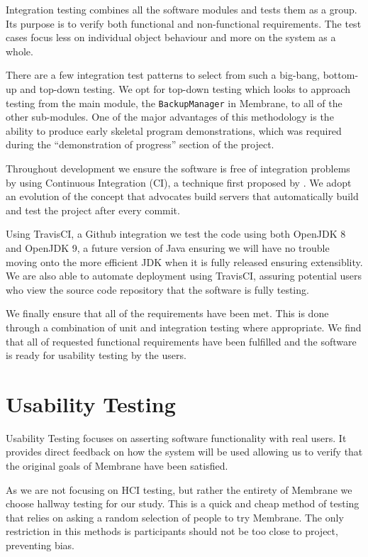 \documentclass[11pt, a4paper, twoside]{report}
\def\code#1{\texttt{#1}}
\begin{document}
Integration testing combines all the software modules and tests them as a group. Its purpose is to verify both functional and non-functional requirements. The test cases focus less on individual object behaviour and more on the system as a whole.

There are a few integration test patterns to select from such a big-bang, bottom-up and top-down testing. \citep{binder2000testing} We opt for top-down testing which looks to approach testing from the main module, the \code{BackupManager} in Membrane, to all of the other sub-modules. One of the major advantages of this methodology is the ability to produce early skeletal program demonstrations, which was required during the ``demonstration of progress'' section of the project.

Throughout development we ensure the software is free of integration problems by using Continuous Integration (CI), a technique first proposed by \cite{booch1991object}. We adopt an evolution of the concept that advocates build servers that automatically build and test the project after every commit. 

Using TravisCI, a Github integration we test the code using both OpenJDK 8 and OpenJDK 9, a future version of Java ensuring we will have no trouble moving onto the more efficient JDK when it is fully released ensuring extensiblity. We are also able to automate deployment using TravisCI, assuring potential users who view the source code repository that the software is fully testing.

We finally ensure that all of the requirements have been met. This is done through a combination of unit and integration testing where appropriate. We find that all of requested functional requirements have been fulfilled and the software is ready for usability testing by the users.

\section{Usability Testing}

Usability Testing focuses on asserting software functionality with real users. It provides direct feedback on how the system will be used \citep{nielsen1994usability} allowing us to verify that the original goals of Membrane have been satisfied.

As we are not focusing on HCI testing, but rather the entirety of Membrane we choose hallway testing for our study. This is a quick and cheap method of testing that relies on asking a random selection of people to try Membrane. The only restriction in this methods is participants should not be too close to project, preventing bias.
\end{document}
